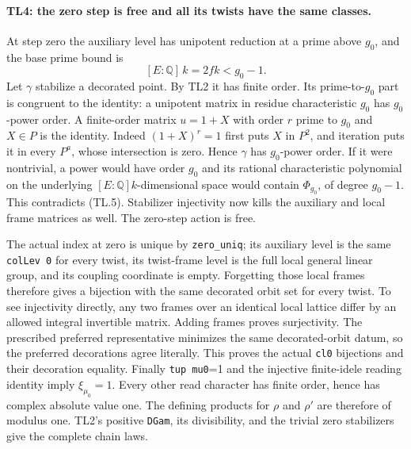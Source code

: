\paragraph{TL4: the zero step is free and all its twists have the same
classes.}
At step zero the auxiliary level has unipotent reduction at a prime
above $g_0$, and the base prime bound is
\[
 [E:\mathbb Q]\,k=2fk<g_0-1.                     \tag{TL.5}
\]
Let $\gamma$ stabilize a decorated point. By TL2 it has finite order.
Its prime-to-$g_0$ part is congruent to the identity: a unipotent
matrix in residue characteristic $g_0$ has $g_0$-power order. A
finite-order matrix $u=1+X$ with order $r$ prime to $g_0$ and
$X\in P$ is the identity. Indeed $(1+X)^r=1$ first puts $X$ in
$P^2$, and iteration puts it in every $P^a$, whose intersection is
zero. Hence $\gamma$ has $g_0$-power order. If it were nontrivial,
a power would have order $g_0$ and its rational characteristic
polynomial on the underlying $[E:\mathbb Q]k$-dimensional space
would contain $\Phi_{g_0}$, of degree $g_0-1$. This contradicts
(TL.5). Stabilizer injectivity now kills the auxiliary and local
frame matrices as well. The zero-step action is free.

The actual index at zero is unique by \texttt{zero\_uniq}; its
auxiliary level is the same \texttt{colLev 0} for every twist, its
twist-frame level is the full local general linear group, and its
coupling coordinate is empty. Forgetting those local frames
therefore gives a bijection with the same decorated orbit set for
every twist. To see injectivity directly, any two frames over an
identical local lattice differ by an allowed integral invertible
matrix. Adding frames proves surjectivity. The prescribed preferred
representative minimizes the same decorated-orbit datum, so the
preferred decorations agree literally. This proves the actual
\texttt{cl0} bijections and their decoration equality.
Finally \texttt{tup mu0}=1 and the injective finite-idele reading
identity imply $\xi_{\mu_0}=1$. Every other read character has finite
order, hence has complex absolute value one. The defining products
for $\rho$ and $\rho'$ are therefore of modulus one. TL2's positive
\texttt{DGam}, its divisibility, and the trivial zero stabilizers
give the complete chain laws.

